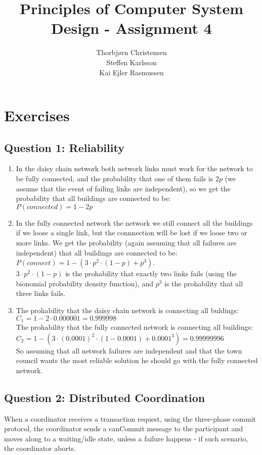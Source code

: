 \documentclass[10pt,a4paper]{article}
\author{Thorbjørn Christensen \\
Steffen Karlsson \\
Kai Ejler Rasmussen}
\title{Principles of Computer System Design - Assignment 4}
\begin{document}
\maketitle

\section*{Exercises}
\subsection*{Question 1: Reliability}
\begin{enumerate}
	\item In the daisy chain network both network links must work for the network to be fully connected, and the probability that one of them fails is $2p$ (we assume that the event of failing links are independent), so we get the probability that all buildings are connected to be: \\
  $P(connected) = 1 - 2p$
 	\item In the fully connected network the network we still connect all the buildings if we loose a single link, but the connnection will be lost if we loose two or more links. We get the probability (again assuming that all failures are independent) that all buildings are connected to be: \\
  $P(connect) = 1 - (3 \cdot p^2 \cdot (1-p) + p^3)$. \\
  $3 \cdot p^2 \cdot (1-p)$ is the prohability that exactly two links fails (using the bionomial probability density function), and $p^3$ is the prohability that all three links fails. 
  \item The prohability that the daisy chain network is connecting all buldings: \\
  $C_1 = 1 - 2 \cdot 0.000001 = 0.999998$ \\
  The prohability that the fully connected network is connecting all buildings: \\
  $C_2 = 1 - (3 \cdot (0.0001)^2 \cdot (1-0.0001) + 0.0001^3) = 0.99999996$ \\
  So assuming that all network failures are independent and that the town council wants the most reliable solution he should go with the fully connected network.
\end{enumerate}


\subsection*{Question 2: Distributed Coordination}
When a coordinator receives a transaction request, using the three-phase commit protocol, the coordinator sends a canCommit message to the participant and moves along to a waiting/idle state, unless a failure happens - if such scenario, the coordinator aborts. 
\newline
\end{document}
